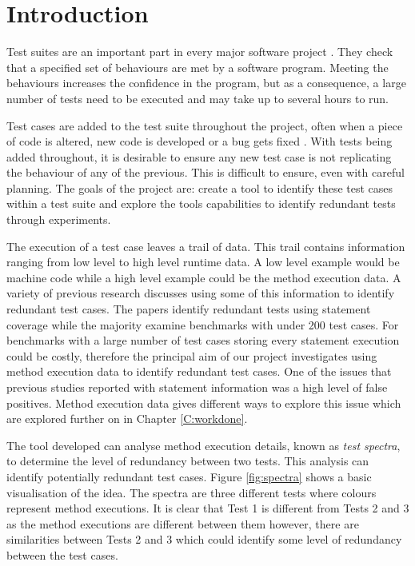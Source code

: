 \chapter{Introduction}\label{C:intro}

Test suites are an important part in every major software project \cite{jeffrey2005test}. They check that a specified set of behaviours are met by a software program. Meeting the behaviours increases the confidence in the program, but as a consequence, a large number of tests need to be executed and may take up to several hours to run.

Test cases are added to the test suite throughout the project, often when a piece of code is altered, new code is developed or a bug gets fixed \cite{issuetrack,whentotest}. With tests being added throughout, it is desirable to ensure any new test case is not replicating the behaviour of any of the previous. This is difficult to ensure, even with careful planning. The goals of the project are: create a tool to identify these test cases within a test suite and explore the tools capabilities to identify redundant tests through experiments. 

The execution of a test case leaves a trail of data. This trail contains information ranging from low level to high level runtime data. A low level example would be machine code while a high level example could be the method execution data. A variety of previous research \cite{wong1995effect, wong1999test, rothermel1998empirical, rothermel2002empirical,koochakzadeh2009test,zhang2011empirical,li2008static} discusses using some of this information to identify redundant test cases. The papers identify redundant tests using statement coverage while the majority examine benchmarks with under 200 test cases. For benchmarks with a large number of test cases storing every statement execution could be costly, therefore the principal aim of our project investigates using method execution data to identify redundant test cases. One of the issues that previous studies reported with statement information was a high level of false positives. Method execution data gives different ways to explore this issue which are explored further on in Chapter \ref{C:workdone}. 

The tool developed can analyse method execution details, known as \textit{test spectra}, to determine the level of redundancy between two tests. This analysis can identify potentially redundant test cases. Figure \ref{fig:spectra} shows a basic visualisation of the idea. The spectra are three different tests where colours represent method executions. It is clear that Test 1 is different from Tests 2 and 3 as the method executions are different between them however, there are similarities between Tests 2 and 3 which could identify some level of redundancy between the test cases. 

